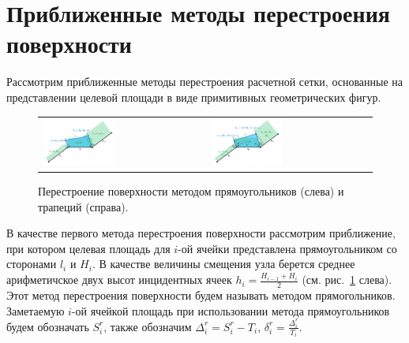\documentclass[
11pt,%
tightenlines,%
twoside,%
onecolumn,%
nofloats,%
nobibnotes,%
nofootinbib,%
superscriptaddress,%
noshowpacs,%
centertags]%
{revtex4}
\begin{document}
\section{Приближенные методы перестроения поверхности}

Рассмотрим приближенные методы перестроения расчетной сетки, основанные на представлении целевой площади в виде примитивных геометрических фигур.

\begin{figure}[ht]
\setcaptionmargin{5mm}
\onelinecaptionstrue  %
\begin{tabular}{ll}
\includegraphics[width=0.45\textwidth]{pics/remesh_rectangles.pdf}
&
\includegraphics[width=0.45\textwidth]{pics/remesh_trapeziums.pdf}
\end{tabular}
\caption{Перестроение поверхности методом прямоугольников (слева) и трапеций (справа).}
\label{fig:text_1_remesh_2d_rectangles_and_trapeziums}
\end{figure}

В качестве первого метода перестроения поверхности рассмотрим приближение, при котором целевая площадь для $i$-ой ячейки представлена прямоугольником со сторонами $l_i$ и $H_i$.
В качестве величины смещения узла берется среднее арифметичское двух высот инцидентных ячеек $h_i = \frac{H_{i - 1} + H_i}{2}$ (см. рис.~\ref{fig:text_1_remesh_2d_rectangles_and_trapeziums} слева).
Этот метод перестроения поверхности будем называть методом прямогольников.
Заметаемую $i$-ой ячейкой площадь при использовании метода прямоугольников будем обозначать $S_i^r$, также обозначим $\Delta_i^r = S_i^r - T_i$, $\delta_i^r = \frac{\Delta_i^r}{T_i}$.
\end{document}
